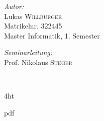 \documentclass[
  fontsize=12pt, %
  a4paper,  %
  oneside,  %
  bibliography=totoc,
  headsepline,
  cleardoublepage=empty,
  parskip=half,
  draft=false
]{scrbook}
\begin{document}
\begin{titlepage}

\begin{minipage}{0.4\textwidth}

\emph{Autor:}\\
Lukas \textsc{Willburger}\\ %
Matrikelnr. 322445 \\
Master Informatik, 1. Semester \\ \newline 


\emph{Seminarleitung: }\\
Prof. Nikolaus \textsc{Steger} \\ \newline  \newline

\end{minipage}\\[1cm]





\vfill %

\end{titlepage}

\iftex4ht
  \Configure{$}{\PicMath}{\EndPicMath}{}

  {pdf}
  {%
  }
\fi


\end{document}

